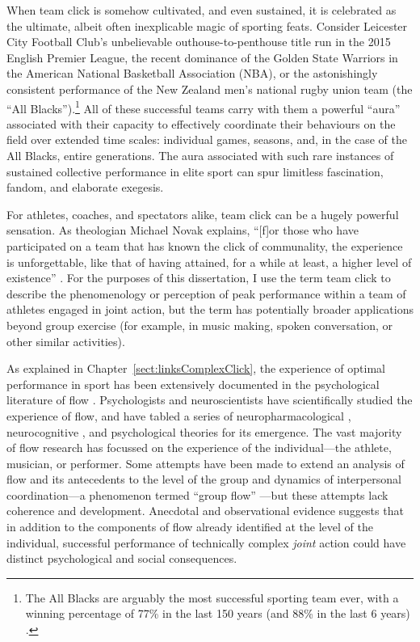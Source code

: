 \begin{CJK}{UTF8}{gbsn}
When team click is somehow cultivated, and even sustained, it is celebrated as the ultimate, albeit often inexplicable magic of sporting feats. Consider Leicester City Football Club's unbelievable outhouse-to-penthouse title run in the 2015 English Premier League, the recent dominance of the Golden State Warriors in the American National Basketball Association (NBA), or the astonishingly consistent performance of the New Zealand men's national rugby union team (the ``All Blacks'').\footnote{The All Blacks are arguably the most successful sporting team ever, with a winning percentage of 77\% in the last 150 years (and 88\% in the last 6 years) \citep{Kerr2013}.} All of these successful teams carry with them a powerful ``aura'' associated with their capacity to effectively coordinate their behaviours on the field over extended time scales: individual games, seasons, and, in the case of the All Blacks, entire generations.  The aura associated with such rare instances of sustained collective performance in elite sport can spur limitless fascination, fandom, and elaborate exegesis.


For athletes, coaches, and spectators alike, team click can be a hugely powerful sensation.  As theologian Michael Novak explains, ``[f]or those who have participated on a team that has known the click of communality, the experience is unforgettable, like that of having attained, for a while at least, a higher level of existence'' \citep[11]{White2011}. For the purposes of this dissertation, I use the term team click to describe the phenomenology or perception of peak performance within a team of athletes engaged in joint action, but the term has potentially broader applications beyond group exercise (for example, in music making, spoken conversation, or other similar activities).

As explained in Chapter~\ref{sect:linksComplexClick}, the experience of optimal performance in sport has been extensively documented in the psychological literature of flow \citep{Csikszentmihalyi1992,Jackson1995,Jackson1999,McNeill1995}.  Psychologists and neuroscientists have scientifically studied the experience of flow, and have tabled a series of neuropharmacological \citep{Boecker2008}, neurocognitive \citep{Dietrich2006,Dietrich2011,Labelle2013}, and psychological \citep{Csikszentmihalyi1992} theories for its emergence.  The vast majority of flow research has focussed on the experience of the individual---the athlete, musician, or performer.  Some attempts have been made to extend an analysis of flow and its antecedents to the level of the group and dynamics of interpersonal coordination---a phenomenon termed ``group flow'' \citep{Sawyer2006}---but these attempts lack coherence and development.  Anecdotal and observational evidence suggests that in addition to the components of flow already identified at the level of the individual, successful performance of technically complex
\textit{joint} action could have distinct psychological and social consequences.


\end{CJK}
